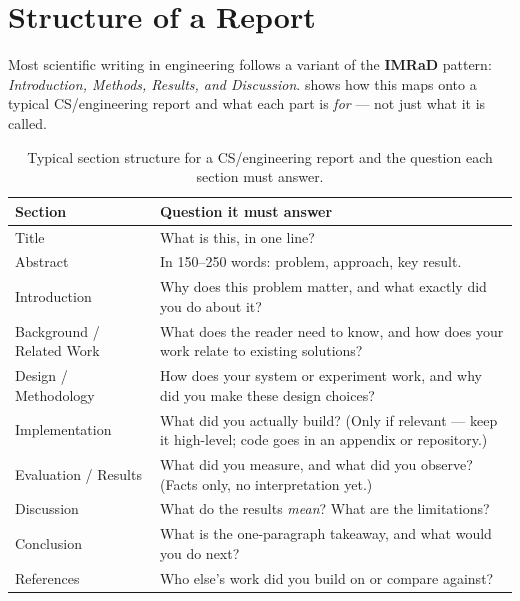 \section{Structure of a Report}
\label{sec:structure}

Most scientific writing in engineering follows a variant of the
\textbf{IMRaD} pattern: \emph{Introduction, Methods, Results, and
Discussion}.  shows how this maps onto a typical
CS/engineering report and what each part is \emph{for} --- not just what
it is called.

\renewcommand{\arraystretch}{1.4}

\begin{table}[htbp]
  \centering
  \caption{Typical section structure for a CS/engineering report and the
  question each section must answer.}
  \label{tab:structure}

  \begin{tabular}{@{}p{4cm}p{10.5cm}@{}}
    \toprule
    \textbf{Section} & \textbf{Question it must answer} \\
    \midrule

    Title & What is this, in one line? \\
    \hline
    Abstract & In 150--250 words: problem, approach, key result. \\
    \hline
    Introduction & Why does this problem matter, and what exactly did you do about it? \\
    \hline
    Background / Related Work & What does the reader need to know, and how does your work relate to existing solutions? \\
    \hline
    Design / Methodology & How does your system or experiment work, and why did you make these design choices? \\
    \hline
    Implementation & What did you actually build? (Only if relevant --- keep it high-level; code goes in an appendix or repository.) \\
    \hline
    Evaluation / Results & What did you measure, and what did you observe? (Facts only, no interpretation yet.) \\
    \hline
    Discussion & What do the results \emph{mean}? What are the limitations? \\
    \hline
    Conclusion & What is the one-paragraph takeaway, and what would you do next? \\
    \hline
    References & Who else's work did you build on or compare against? \\

    \bottomrule
  \end{tabular}
\end{table}

